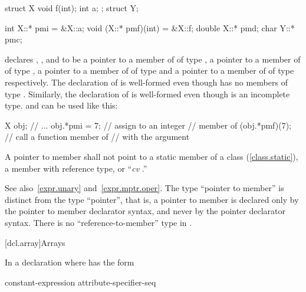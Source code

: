 \pnum
\enterexample%

\begin{codeblock}
struct X {
  void f(int);
  int a;
};
struct Y;

int X::* pmi = &X::a;
void (X::* pmf)(int) = &X::f;
double X::* pmd;
char Y::* pmc;
\end{codeblock}

declares
,
,
and
to be a pointer to a member of
of type
,
a pointer to a member of
of type
,
a pointer to a member of
of type
and a pointer to a member of
of type
respectively.
The declaration of
is well-formed even though
has no members of type
.
Similarly, the declaration of
is well-formed even though
is an incomplete type.
and
can be used like this:

\begin{codeblock}
X obj;
// ...
obj.*pmi = 7;       // assign  to an integer
                    // member of 
(obj.*pmf)(7);      // call a function member of 
                    // with the argument 
\end{codeblock}
\exitexample

\pnum
A pointer to member shall not point to a static member
of a class (\ref{class.static}),
a member with reference type,
or
``\textit{cv}
.''

\enternote
See also~\ref{expr.unary} and~\ref{expr.mptr.oper}.
The type ``pointer to member'' is distinct from the type ``pointer'',
that is, a pointer to member is declared only by the pointer to member
declarator syntax, and never by the pointer declarator syntax.
There is no ``reference-to-member'' type in \Cpp.
\exitnote

[dcl.array]{Arrays}%

\pnum
In a declaration
where
has the form

\begin{ncsimplebnf}
\terminal{D1 [} constant-expression\opt \terminal{]} attribute-specifier-seq\opt
\end{ncsimplebnf}

